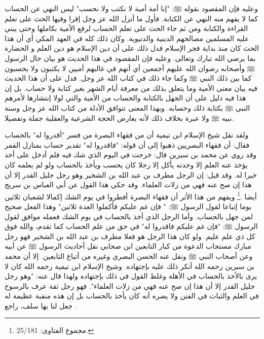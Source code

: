 وعليه فإن المقصود بقوله ﷺ: "إنا أمة أمية لا نكتب ولا نحسب" ليس النهي عن الحساب كما لا يفهم منه النهي عن الكتابة. فأول ما أنزل الله عز وجل إقرا وفيها الحث على تعلم القراءة والكتابة ومن ثم جاء الحث على تعلم الحساب لرفع الأمية بكاملها وحتى يبني عليه المسلمين مصالحهم الدينية والدنيوية. وكان ذلك كله في العهد المكي أي أن هذا الحث كان منذ بداية فجر الإسلام فدل ذلك على أن دين الإسلام هو دين العلم و الحضارة بما يرضي الله تبارك وتعالى. وعليه فإن المقصود في هذا الحديث هو بيان حال الرسول ﷺ وأصحابه رضوان الله عليهم أجمعين أي أنهم في غالبهم أميين لا يكتبون ولا يحسبون كما بين ذلك النبي ﷺ وكما جاء ذلك في كتاب الله عز وجل. فدل على أن هذا الحديث فيه بيان معنى الأمية وما يتعلق بذلك من معرفة أيام الشهر بغير كتابة ولا حساب. بل إن هذا فيه دليل على أن الجهل بالكتابة والحساب من الأمية والتي لولا إنتشارها لأمرهم النبي ﷺ بكتابة ذلك وحسابه. وبهذا المعنى تتوافق الأدلة من كتاب الله عز وجل وسنة نبيه ﷺ ولا عبرة بخلاف ذلك لأنه يعارض الحجة الشرعية والعقلية جملة وتفصيلا.

ولقد نقل شيخ الإسلام ابن تيمية أن من فقهاء البصرة من فسر "أقدروا له" بالحساب فقال: أن فقهاء البصريين ذهبوا إلى أن قوله: "فاقدروا له" تقدير حساب بمنازل القمر وقد روي عن محمد بن سيرين قال: خرجت في اليوم الذي شك فيه فلم أدخل على أحد يؤخذ عنه العلم إلا وجدته يأكل إلا رجلا كان يحسب ويأخذ بالحساب ولو لم يعلمه كان خيرا له. وقد قيل: إن الرجل مطرف بن عبد الله بن الشخير وهو رجل جليل القدر إلا أن هذا إن صح عنه فهي من زلات العلماء. وقد حكي هذا القول عن أبي العباس بن سريج أيضا \href{https://shamela.ws/book/7289/12629#p1}{\faExternalLink} \cite{muslim}.\footnote{مجموع الفتاوى: 25/181.} ويفهم من هذا الأثر أن فقهاء البصرة أفطروا في يوم الشك إكمالا لشعبان ثلاثين يوما إتباعا لقول الرسول ﷺ: " فإن غم عليكم فأكملوا العدة ثلاثين" وهذا الفعل صحيح لمن جهل بالحساب. وأما الرجل الذي أخذ بالحساب في يوم الشك فعمله موافق لقول الرسول ﷺ: "فإن غم عليكم فاقدروا له" في حق من علم الحساب كما تقدم، والله فوق كل ذي علم عليم. ولو كان هذا الرجل هو فعلا مطرف بن عبد الله بن الشخير فهو رجل مبارك مستجاب الدعوة من كبار التابعين ابن صحابي نقل أحاديث الرسول ﷺ عن أبيه وعن أصحاب النبي ﷺ ونقل عنه الحسن البصري وغيره من أتباع التابعين. إلا أن محمد بن سيرين رحمه الله أنكر ذلك عليه بإجتهاده. وشيخ الإسلام ابن تيمية رحمه الله كان لا يرى بالأخذ بالحساب في الأهلة وغلظ القول في ذلك بإجتهاده ولهذا قال عنه: "وهو رجل جليل القدر إلا أن هذا إن صح عنه فهي من زلات العلماء". فهو رجل ثقة عرف بالرسوخ في العلم والثبات في الفتن ولا يضره أنه كان يأخذ بالحساب بل إن هذه منقبة عظيمة له جعل لنا بها سلف، راجع .

